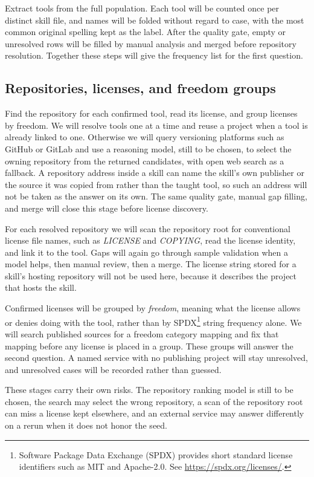 Extract tools from the full population.
Each tool will be counted once per distinct skill file, and names will be folded without regard to case, with the most common original spelling kept as the label.
After the quality gate, empty or unresolved rows will be filled by manual analysis and merged before repository resolution.
Together these steps will give the frequency list for the first question.

\subsection{Repositories, licenses, and freedom groups}

Find the repository for each confirmed tool, read its license, and group licenses by freedom.
We will resolve tools one at a time and reuse a project when a tool is already linked to one.
Otherwise we will query versioning platforms such as GitHub or GitLab and use a reasoning model, still to be chosen, to select the owning repository from the returned candidates, with open web search as a fallback.
A repository address inside a skill can name the skill's own publisher or the source it was copied from rather than the taught tool, so such an address will not be taken as the answer on its own.
The same quality gate, manual gap filling, and merge will close this stage before license discovery.

For each resolved repository we will scan the repository root for conventional license file names, such as \textit{LICENSE} and \textit{COPYING}, read the license identity, and link it to the tool.
Gaps will again go through sample validation when a model helps, then manual review, then a merge.
The license string stored for a skill's hosting repository will not be used here, because it describes the project that hosts the skill.

Confirmed licenses will be grouped by \emph{freedom}, meaning what the license allows or denies doing with the tool, rather than by SPDX\footnote{Software Package Data Exchange (SPDX) provides short standard license identifiers such as MIT and Apache-2.0. See \url{https://spdx.org/licenses/}.} string frequency alone.
We will search published sources for a freedom category mapping and fix that mapping before any license is placed in a group.
These groups will answer the second question.
A named service with no publishing project will stay unresolved, and unresolved cases will be recorded rather than guessed.

These stages carry their own risks.
The repository ranking model is still to be chosen, the search may select the wrong repository, a scan of the repository root can miss a license kept elsewhere, and an external service may answer differently on a rerun when it does not honor the seed.

